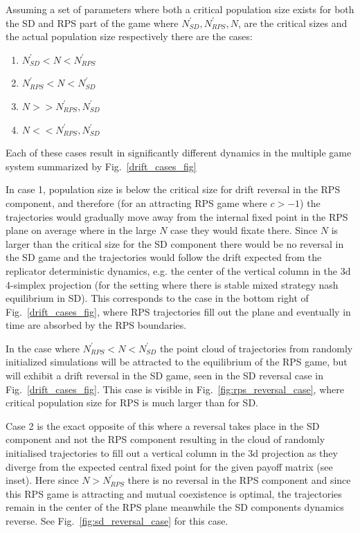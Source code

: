 \documentclass[%
 reprint,
 amsmath,amssymb,
 aps,
]{revtex4-2}
\begin{document}
Assuming a set of parameters where both a critical population size exists
for both the SD and RPS part of the game where $N^\prime_{SD}, N^\prime_{RPS}, N$,
are the critical sizes and the actual population size respectively there
are the cases:


\begin{enumerate}[itemsep=0mm, parsep=2pt]
  \centering
  \item $N^\prime_{SD} < N < N^\prime_{RPS}$
  \item $N^\prime_{RPS} < N < N^\prime_{SD}$
  \item $N >> N^\prime_{RPS}, N^\prime_{SD}$
  \item $N << N^\prime_{RPS}, N^\prime_{SD}$
\end{enumerate}

Each of these cases result in significantly 
different dynamics in the multiple game system summarized by
Fig.~\ref{drift_cases_fig}

In case 1, population size is below the critical size for 
drift reversal in the RPS component, and therefore 
(for an attracting RPS game where $c > -1$) the trajectories would 
gradually move away from the internal fixed point in the RPS plane 
on average where in the large $N$ case they would fixate there.
Since $N$ is larger than the critical size for the SD component there 
would be no reversal in the SD game and the trajectories would follow the 
drift expected from the replicator deterministic dynamics, e.g. the 
center of the vertical column in the 3d 4-simplex projection (for the
setting where there is stable mixed strategy nash equilibrium in SD).
This corresponds to the case in the bottom right of Fig.~\ref{drift_cases_fig}, 
where RPS trajectories fill out the plane and eventually in time are absorbed by 
the RPS boundaries.

In the case where $N^\prime_{RPS} < N < N^\prime_{SD}$ the point cloud of trajectories from 
randomly initialized simulations will be attracted to the equilibrium of the RPS game, but will
exhibit a drift reversal in the SD game, seen in the SD reversal case in Fig.~\ref{drift_cases_fig}.
This case is visible in Fig.~\ref{fig:rps_reversal_case}, where critical population size 
for RPS is much larger than for SD.


Case 2 is the exact opposite of this where a reversal takes place in 
the SD component and not the RPS component resulting in the 
cloud of randomly initialised trajectories to 
fill out a vertical column in the 3d projection as they diverge
from the expected central fixed point for the given payoff matrix (see inset).
Here since $N > N^\prime_{RPS}$ there is no reversal in the RPS component
and since this RPS game is attracting and mutual coexistence is optimal, the 
trajectories remain in the center of the RPS plane meanwhile the SD components
dynamics reverse. See Fig.~\ref{fig:sd_reversal_case} for this case.
\end{document}
